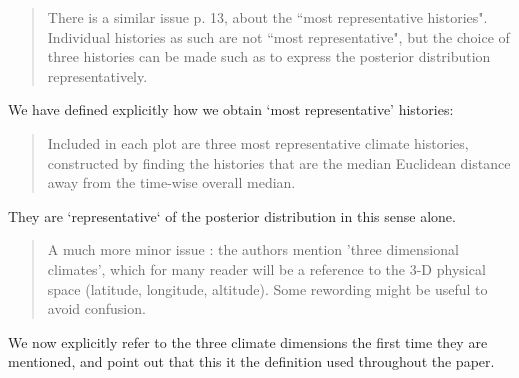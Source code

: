 \documentclass[a4paper,11pt]{article}
\begin{document}
\begin{framed} \begin{quote}
There is a similar issue p. 13, about the ``most representative histories". Individual histories as such are not ``most representative", but the choice of three histories can be made such as to express the posterior distribution representatively. 
\end{quote} \end{framed}

We have defined explicitly how we obtain `most representative' histories: 
\begin{quote}
Included in each plot are three most representative climate histories, constructed by finding the histories that are the median Euclidean distance away from the time-wise overall median.
\end{quote} 

They are `representative` of the posterior distribution in this sense alone.


\begin{framed} \begin{quote}
A much more minor issue : the authors mention 'three dimensional climates', which for many reader will be a reference to the 3-D physical space (latitude, longitude, altitude). Some rewording might be useful to avoid confusion. 
\end{quote} \end{framed}

We now explicitly refer to the three climate dimensions the first time they are mentioned, and point out that this it the definition used throughout the paper. 
\end{document}
